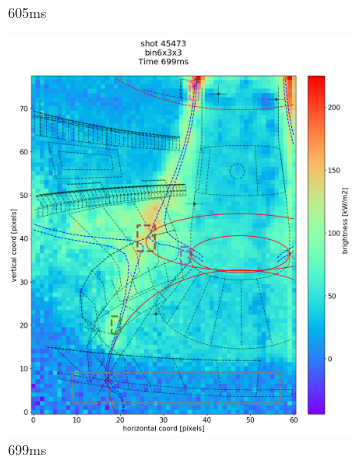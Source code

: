 \begin{figure}
\begin{subfigure}{0.355\linewidth}
         \caption{605ms}
         \label{fig:45473_export_3}
     \end{subfigure}
     \begin{subfigure}{0.355\linewidth}
         \centering
         \includegraphics[trim={50 25 25 80},clip,width=\textwidth]{Chapters/chapter2/figs/IRVB-MASTU_shot-45473_export_37.png}
         \caption{699ms}
         \label{fig:45473_export_4}
     \end{subfigure}
     \begin{subfigure}{0.4\linewidth}
         \centering

\end{subfigure}
\end{figure}
